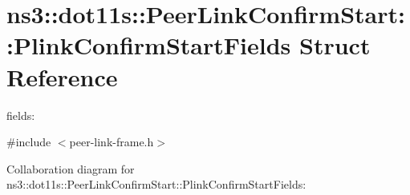 \hypertarget{structns3_1_1dot11s_1_1PeerLinkConfirmStart_1_1PlinkConfirmStartFields}{}\section{ns3\+:\+:dot11s\+:\+:Peer\+Link\+Confirm\+Start\+:\+:Plink\+Confirm\+Start\+Fields Struct Reference}
\label{structns3_1_1dot11s_1_1PeerLinkConfirmStart_1_1PlinkConfirmStartFields}


fields\+:  




{\ttfamily \#include $<$peer-\/link-\/frame.\+h$>$}



Collaboration diagram for ns3\+:\+:dot11s\+:\+:Peer\+Link\+Confirm\+Start\+:\+:Plink\+Confirm\+Start\+Fields\+:
